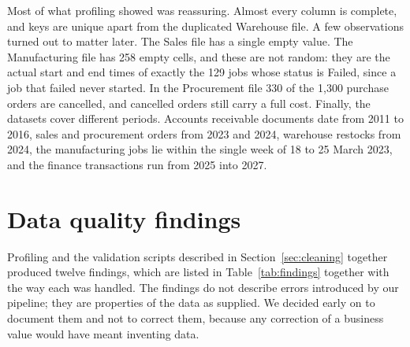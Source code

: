 \documentclass[12pt,a4paper]{report}
\begin{document}
Most of what profiling showed was reassuring. Almost every column is complete, and keys are unique apart from the duplicated Warehouse file. A few observations turned out to matter later. The Sales file has a single empty value. The Manufacturing file has 258 empty cells, and these are not random: they are the actual start and end times of exactly the 129 jobs whose status is Failed, since a job that failed never started. In the Procurement file 330 of the 1,300 purchase orders are cancelled, and cancelled orders still carry a full cost. Finally, the datasets cover different periods. Accounts receivable documents date from 2011 to 2016, sales and procurement orders from 2023 and 2024, warehouse restocks from 2024, the manufacturing jobs lie within the single week of 18 to 25 March 2023, and the finance transactions run from 2025 into 2027.

\section{Data quality findings}\label{sec:findings}
Profiling and the validation scripts described in Section~\ref{sec:cleaning} together produced twelve findings, which are listed in Table~\ref{tab:findings} together with the way each was handled. The findings do not describe errors introduced by our pipeline; they are properties of the data as supplied. We decided early on to document them and not to correct them, because any correction of a business value would have meant inventing data.
\end{document}
